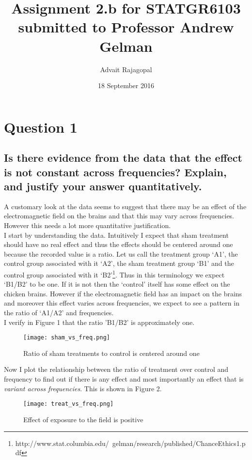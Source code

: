 \documentclass{article}
\title{Assignment 2.b for \textbf{STATGR6103}\\
\large submitted to Professor Andrew Gelman}
\date{18 September 2016}
\author{Advait Rajagopal}
\begin{document}
  \maketitle
  
\section{Question 1}
\subsection{Is there evidence from the data that the effect is not constant across frequencies? Explain, and justify your answer quantitatively.}

A customary look at the data seems to suggest that there may be an effect of the electromagnetic field on the brains and that this may vary across frequencies. However this needs a lot more quantitative justification. \\
I start by understanding the data. Intuitively I expect that sham treatment should have no real effect and thus the effects should be centered around one because the recorded value is a ratio. Let us call the treatment group `A1', the control group associated with it `A2', the sham treatment group `B1' and the control group associated with it `B2'\footnote{http://www.stat.columbia.edu/~gelman/research/published/ChanceEthics1.pdf}. Thus in this terminology we expect `B1/B2' to be one. If it is not then the `control' itself has some effect on the chicken brains. However if the electromagnetic field has an impact on the brains and moreover this effect varies across frequencies, we expect to see a pattern in the ratio of `A1/A2' and frequencies. \\
I verify in Figure 1 that the ratio 'B1/B2' is approximately one.
 \begin{figure}[H]
\centering
\texttt{[image: sham\_vs\_freq.png]}
\caption{Ratio of sham treatments to control is centered around one}
\label{deltat}
\end{figure}
\newpage
Now I plot the relationship between the ratio of treatment over control and frequency to find out if there is any effect and most importantly an effect that is \emph{variant across frequencies}. This is shown in Figure 2.
 \begin{figure}[H]
\centering
\texttt{[image: treat\_vs\_freq.png]}
\caption{Effect of exposure to the field is positive}
\label{deltat}
\end{figure}
\end{document}
